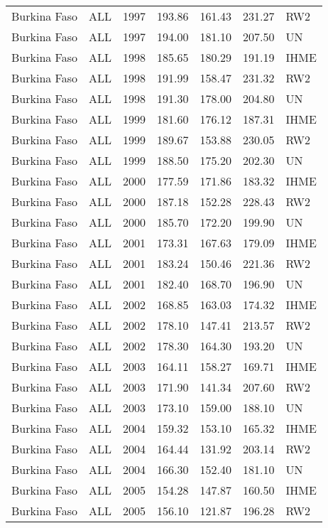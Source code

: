 \begin{longtable}{lllrrrl}
  Burkina Faso & ALL & 1997 & 193.86 & 161.43 & 231.27 & RW2 \\ 
  Burkina Faso & ALL & 1997 & 194.00 & 181.10 & 207.50 & UN \\ 
  Burkina Faso & ALL & 1998 & 185.65 & 180.29 & 191.19 & IHME \\ 
  Burkina Faso & ALL & 1998 & 191.99 & 158.47 & 231.32 & RW2 \\ 
  Burkina Faso & ALL & 1998 & 191.30 & 178.00 & 204.80 & UN \\ 
  Burkina Faso & ALL & 1999 & 181.60 & 176.12 & 187.31 & IHME \\ 
  Burkina Faso & ALL & 1999 & 189.67 & 153.88 & 230.05 & RW2 \\ 
  Burkina Faso & ALL & 1999 & 188.50 & 175.20 & 202.30 & UN \\ 
  Burkina Faso & ALL & 2000 & 177.59 & 171.86 & 183.32 & IHME \\ 
  Burkina Faso & ALL & 2000 & 187.18 & 152.28 & 228.43 & RW2 \\ 
  Burkina Faso & ALL & 2000 & 185.70 & 172.20 & 199.90 & UN \\ 
  Burkina Faso & ALL & 2001 & 173.31 & 167.63 & 179.09 & IHME \\ 
  Burkina Faso & ALL & 2001 & 183.24 & 150.46 & 221.36 & RW2 \\ 
  Burkina Faso & ALL & 2001 & 182.40 & 168.70 & 196.90 & UN \\ 
  Burkina Faso & ALL & 2002 & 168.85 & 163.03 & 174.32 & IHME \\ 
  Burkina Faso & ALL & 2002 & 178.10 & 147.41 & 213.57 & RW2 \\ 
  Burkina Faso & ALL & 2002 & 178.30 & 164.30 & 193.20 & UN \\ 
  Burkina Faso & ALL & 2003 & 164.11 & 158.27 & 169.71 & IHME \\ 
  Burkina Faso & ALL & 2003 & 171.90 & 141.34 & 207.60 & RW2 \\ 
  Burkina Faso & ALL & 2003 & 173.10 & 159.00 & 188.10 & UN \\ 
  Burkina Faso & ALL & 2004 & 159.32 & 153.10 & 165.32 & IHME \\ 
  Burkina Faso & ALL & 2004 & 164.44 & 131.92 & 203.14 & RW2 \\ 
  Burkina Faso & ALL & 2004 & 166.30 & 152.40 & 181.10 & UN \\ 
  Burkina Faso & ALL & 2005 & 154.28 & 147.87 & 160.50 & IHME \\ 
  Burkina Faso & ALL & 2005 & 156.10 & 121.87 & 196.28 & RW2 \\ 

\end{longtable}

